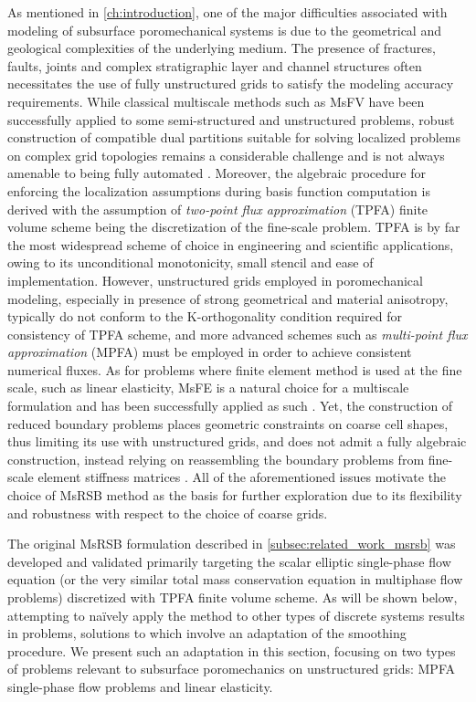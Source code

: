 As mentioned in \cref{ch:introduction}, one of the major difficulties associated with modeling of subsurface poromechanical systems is due to the geometrical and geological complexities of the underlying medium.    The presence of fractures, faults, joints and complex stratigraphic layer and channel structures often necessitates the use of fully unstructured grids to satisfy the modeling accuracy requirements.   While classical multiscale methods such as MsFV have been successfully applied to some semi-structured and unstructured problems, robust construction of compatible dual partitions suitable for solving localized problems on complex grid topologies remains a considerable challenge and is not always amenable to being fully automated \cite{Moyner2014a}.   Moreover, the algebraic procedure for enforcing the localization assumptions during basis function computation is derived with the assumption of \textit{two-point flux approximation} (TPFA) finite volume scheme being the discretization of the fine-scale problem.   TPFA is by far the most widespread scheme of choice in engineering and scientific applications, owing to its unconditional monotonicity, small stencil and ease of implementation.   However, unstructured grids employed in poromechanical modeling, especially in presence of strong geometrical and material anisotropy, typically do not conform to the K-orthogonality condition required for consistency of TPFA scheme, and more advanced schemes such as \textit{multi-point flux approximation} (MPFA) must be employed in order to achieve consistent numerical fluxes.   As for problems where finite element method is used at the fine scale, such as linear elasticity, MsFE is a natural choice for a multiscale formulation and has been successfully applied as such \cite{Buck2013}.   Yet, the construction of reduced boundary problems places geometric constraints on coarse cell shapes, thus limiting its use with unstructured grids, and does not admit a fully algebraic construction, instead relying on reassembling the boundary problems from fine-scale element stiffness matrices \cite{Castelletto2017}.   All of the aforementioned issues motivate the choice of MsRSB method as the basis for further exploration due to its flexibility and robustness with respect to the choice of coarse grids.

The original MsRSB formulation described in \cref{subsec:related_work_msrsb} was developed and validated primarily targeting the scalar elliptic single-phase flow equation (or the very similar total mass conservation equation in multiphase flow problems) discretized with TPFA finite volume scheme.    As will be shown below, attempting to na\"{i}vely apply the method to other types of discrete systems results in problems, solutions to which involve an adaptation of the smoothing procedure.   We present such an adaptation in this section, focusing on two types of problems relevant to subsurface poromechanics on unstructured grids: MPFA single-phase flow problems and linear elasticity.

